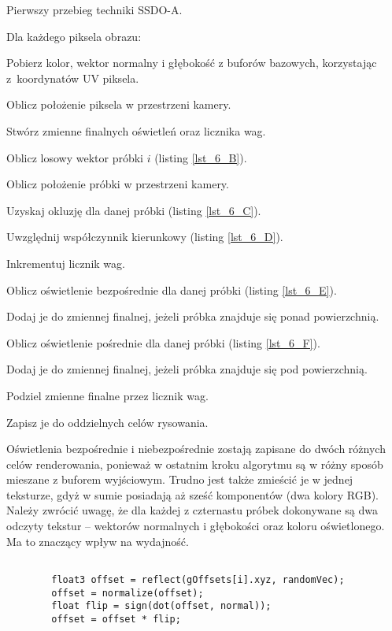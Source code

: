 		\begin{algorithm}[H]
			\label{alg_6_A}
			\caption{Pierwszy przebieg techniki SSDO-A.}	
			Dla każdego piksela obrazu:
			
			\Indp
			
			Pobierz kolor, wektor normalny i głębokość z buforów bazowych, korzystając z~koordynatów UV piksela.
			
			Oblicz położenie piksela w przestrzeni kamery.
			
			Stwórz zmienne finalnych oświetleń oraz licznika wag.
			
			{
				Oblicz losowy wektor próbki \(i\) (listing \ref{lst_6_B}).
				
				Oblicz położenie próbki w przestrzeni kamery.
				
				Uzyskaj okluzję dla danej próbki (listing \ref{lst_6_C}).
				
				Uwzględnij współczynnik kierunkowy (listing \ref{lst_6_D}).
				
				Inkrementuj licznik wag.
				
				Oblicz oświetlenie bezpośrednie dla danej próbki (listing \ref{lst_6_E}).
				
				Dodaj je do zmiennej finalnej, jeżeli próbka znajduje się ponad powierzchnią.
				
				Oblicz oświetlenie pośrednie dla danej próbki (listing \ref{lst_6_F}).
				
				Dodaj je do zmiennej finalnej, jeżeli próbka znajduje się pod powierzchnią.
			}
		
			Podziel zmienne finalne przez licznik wag.
			
			Zapisz je do oddzielnych celów rysowania.
			
			\Indm
		\end{algorithm}
		\flushbottom
		Oświetlenia bezpośrednie i niebezpośrednie zostają zapisane do dwóch różnych celów renderowania, ponieważ w ostatnim kroku algorytmu są w różny sposób mieszane z buforem wyjściowym. Trudno jest także zmieścić je w jednej teksturze, gdyż w sumie posiadają aż sześć komponentów (dwa kolory RGB).
		Należy zwrócić uwagę, że dla każdej z czternastu próbek dokonywane są dwa odczyty tekstur -- wektorów normalnych i głębokości oraz koloru oświetlonego. Ma to znaczący wpływ na wydajność.
		
		\begin{lstlisting}[language=HLSL,caption={Obliczenie losowego wektora próbki.},label={lst_6_B}]
		
		float3 offset = reflect(gOffsets[i].xyz, randomVec);
		offset = normalize(offset);
		float flip = sign(dot(offset, normal));
		offset = offset * flip;
		
		\end{lstlisting}
		
